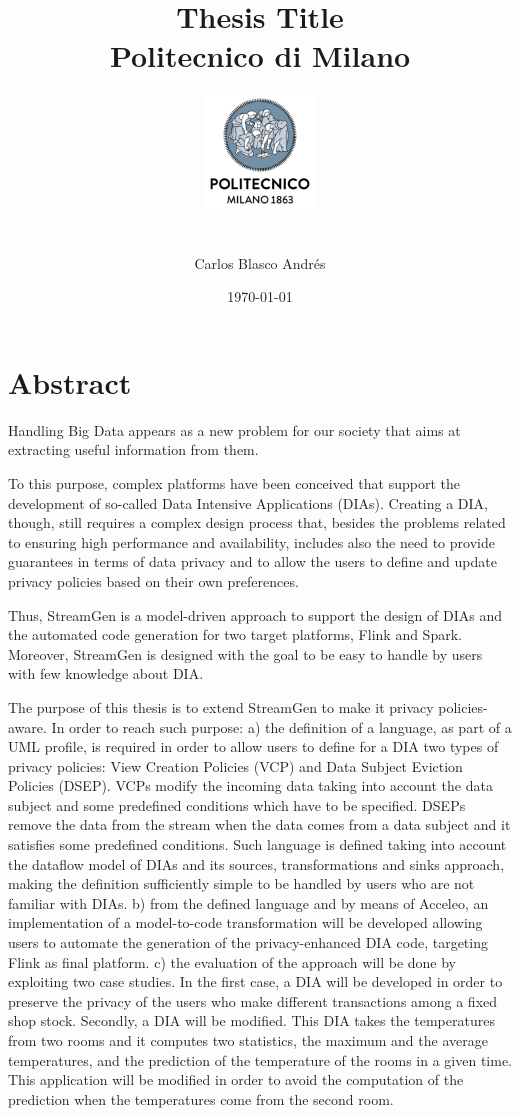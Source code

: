 \documentclass[12pt,twoside]{book}
\title{
{Thesis Title}\\
{\large Politecnico di Milano}\\
{\includegraphics[width=3cm, height=4cm]{university.png}}
}
\author{Carlos Blasco Andrés}
\date{\today}
\begin{document}
\maketitle

\chapter*{Abstract}
Handling Big Data appears as a new problem for our society that aims at extracting useful information from them.

To this purpose, complex platforms have been conceived that support the development of so-called Data Intensive Applications (DIAs). Creating a DIA, though, still requires a complex design process that, besides the problems related to ensuring high performance and availability, includes also the need to provide guarantees in terms of data privacy and to allow the users to define and update privacy policies based on their own preferences.

Thus, StreamGen is a model-driven approach to support the design of DIAs and the automated code generation for two target platforms, Flink and Spark. Moreover, StreamGen is designed with the goal to be easy to handle by users with few knowledge about DIA.

The purpose of this thesis is to extend StreamGen to make it privacy policies-aware. In order to reach such purpose:
a) the definition of a language, as part of a UML profile, is required in order to allow users to define for a DIA two types of privacy policies: View Creation Policies (VCP) and Data Subject Eviction Policies (DSEP). VCPs modify the incoming data taking into account the data subject and some predefined conditions which have to be specified. DSEPs remove the data from the stream when the data comes from a data subject and it satisfies some predefined conditions. Such language is defined taking into account the dataflow model of DIAs and its sources, transformations and sinks approach, making the definition sufficiently simple to be handled by users who are not familiar with DIAs.
b) from the defined language and by means of Acceleo, an implementation of a model-to-code transformation will be developed allowing users to automate the generation of the privacy-enhanced DIA code, targeting Flink as final platform.
c) the evaluation of the approach will be done by exploiting two case studies. In the first case, a DIA will be developed in order to preserve the privacy of the users who make different transactions among a fixed shop stock. Secondly, a DIA will be modified. This DIA takes the temperatures from two rooms and it computes two statistics, the maximum and the average temperatures, and the prediction of the temperature of the rooms in a given time. This application will be modified in order to avoid the computation of the prediction when the temperatures come from the second room.
\end{document}
